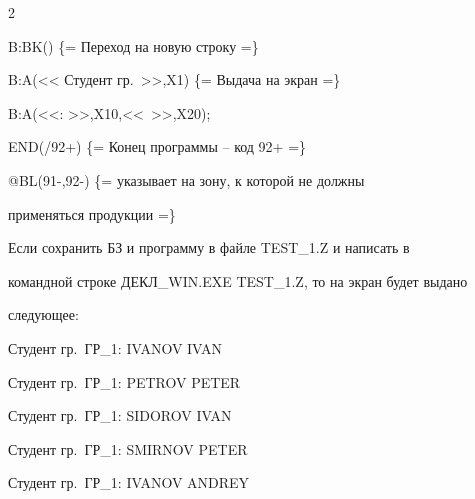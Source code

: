 \begin{multicols}{2}
{\noindent


 B:BK() \{= Переход на новую строку =\}





\noindent


 B:A(<< Студент гр.\ >>,X1) \{= Выдача на экран =\}





\noindent


 B:A(<<: >>,X10,<<\ >>,X20);





\noindent


 END(/92+) \{= Конец программы -- код 92+ =\}





\noindent


 @BL(91-,92-) \{= указывает на зону, к которой не должны





  применяться продукции =\}





 }





 Если сохранить БЗ и программу в файле TEST\_1.Z и написать в


командной строке ДЕКЛ\_WIN.EXE TEST\_1.Z, то на экран будет выдано


следующее:





 Студент гр.\ ГР\_1: IVANOV IVAN





 Студент гр.\ ГР\_1: PETROV PETER





 Студент гр.\ ГР\_1: SIDOROV IVAN





 Студент гр.\ ГР\_1: SMIRNOV PETER





 Студент гр.\ ГР\_1: IVANOV ANDREY








\vspace*{-6pt}






\end{multicols}
